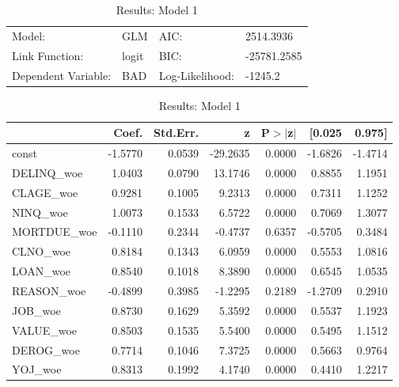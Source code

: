 \begin{table}
\renewcommand{\arraystretch}{1.25}
\begin{center}
\begin{tabular}{llll}
\hline
Model:              & GLM              & AIC:            & 2514.3936    \\
Link Function:      & logit            & BIC:            & -25781.2585  \\
Dependent Variable: & BAD              & Log-Likelihood: & -1245.2      \\
\hline
\end{tabular}
\end{center}
\begin{center}
\begin{tabular}{lrrrrrr}
\hline
             &  Coef.  & Std.Err. &    z     & P$> |$z$|$ &  [0.025 &  0.975]  \\
\hline
\hline
const        & -1.5770 &   0.0539 & -29.2635 &      0.0000 & -1.6826 & -1.4714  \\
DELINQ\_woe  &  1.0403 &   0.0790 &  13.1746 &      0.0000 &  0.8855 &  1.1951  \\
CLAGE\_woe   &  0.9281 &   0.1005 &   9.2313 &      0.0000 &  0.7311 &  1.1252  \\
NINQ\_woe    &  1.0073 &   0.1533 &   6.5722 &      0.0000 &  0.7069 &  1.3077  \\
MORTDUE\_woe & -0.1110 &   0.2344 &  -0.4737 &      0.6357 & -0.5705 &  0.3484  \\
CLNO\_woe    &  0.8184 &   0.1343 &   6.0959 &      0.0000 &  0.5553 &  1.0816  \\
LOAN\_woe    &  0.8540 &   0.1018 &   8.3890 &      0.0000 &  0.6545 &  1.0535  \\
REASON\_woe  & -0.4899 &   0.3985 &  -1.2295 &      0.2189 & -1.2709 &  0.2910  \\
JOB\_woe     &  0.8730 &   0.1629 &   5.3592 &      0.0000 &  0.5537 &  1.1923  \\
VALUE\_woe   &  0.8503 &   0.1535 &   5.5400 &      0.0000 &  0.5495 &  1.1512  \\
DEROG\_woe   &  0.7714 &   0.1046 &   7.3725 &      0.0000 &  0.5663 &  0.9764  \\
YOJ\_woe     &  0.8313 &   0.1992 &   4.1740 &      0.0000 &  0.4410 &  1.2217  \\
\hline
\end{tabular}
\end{center}
\caption{Results: Model 1 \label{table:results_1}}
\end{table}

